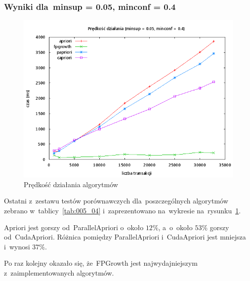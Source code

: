 
\subsubsection{Wyniki dla~minsup = 0.05, minconf = 0.4}

\begin{figure}[H]
\centering
\includegraphics[width=1.1\textwidth]{figures/06/005_04.png}
\caption{Prędkość działania algorytmów\label{rys:005_04}}
\end{figure}

Ostatni z~zestawu testów porównawczych dla~poszczególnych algorytmów zebrano w~tablicy~\ref{tab:005_04} i~zaprezentowano na~wykresie na~rysunku~\ref{rys:005_04}. 

Apriori jest gorszy od~ParallelApriori o~około $12\%$, a~o~około $53\%$ gorszy od~CudaApriori. Różnica pomiędzy ParallelApriori i~CudaApriori jest mniejsza i~wynosi $37\%$. 

Po raz kolejny okazało się, że~FPGrowth jest najwydajniejszym z~zaimplementowanych algorytmów.

